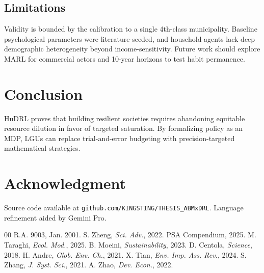 \documentclass[journal,a4paper]{IEEEtran}
\begin{document}
\subsection{Limitations}
Validity is bounded by the calibration to a single 4th-class municipality. Baseline psychological parameters were literature-seeded, and household agents lack deep demographic heterogeneity beyond income-sensitivity. Future work should explore MARL for commercial actors and 10-year horizons to test habit permanence.

\section{Conclusion}
HuDRL proves that building resilient societies requires abandoning equitable resource dilution in favor of targeted saturation. By formalizing policy as an MDP, LGUs can replace trial-and-error budgeting with precision-targeted mathematical strategies.

\section*{Acknowledgment}
Source code available at \texttt{github.com/KINGSTING/THESIS\_ABMxDRL}. Language refinement aided by Gemini Pro.

\begin{thebibliography}{00}
 R.A. 9003, Jan. 2001.
 S. Zheng, \textit{Sci. Adv.}, 2022.
 PSA Compendium, 2025.
 M. Taraghi, \textit{Ecol. Mod.}, 2025.
 B. Moeini, \textit{Sustainability}, 2023.
 D. Centola, \textit{Science}, 2018.
 H. Andre, \textit{Glob. Env. Ch.}, 2021.
 X. Tian, \textit{Env. Imp. Ass. Rev.}, 2024.
 S. Zhang, \textit{J. Syst. Sci.}, 2021.
 A. Zhao, \textit{Dev. Econ.}, 2022.
\end{thebibliography}
\end{document}
